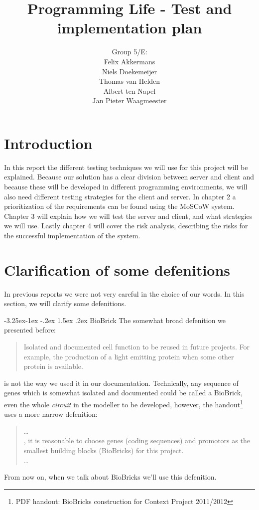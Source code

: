 \documentclass[a4paper]{article}
\title{Programming Life - Test and implementation plan }
\author{Group 5/E:\\
Felix Akkermans \\
Niels Doekemeijer \\
Thomas van Helden \\
Albert ten Napel \\
Jan Pieter Waagmeester}
\makeatletter
\renewcommand\paragraph{\@startsection{paragraph}{4}{\z@}%
  {-3.25ex\@plus -1ex \@minus -.2ex}%
  {1.5ex \@plus .2ex}%
  {\normalfont\normalsize\bfseries}}
\makeatother
\begin{document}
\maketitle

\vfill

\small{\tableofcontents}
\pagebreak

\section{Introduction}
In this report the different testing techniques we will use for this project will be explained. Because our solution has a clear division between server and client and because these will be developed in different programming environments, we will also need different testing strategies for the client and server. In chapter 2 a prioritization of the requirements can be found using the MoSCoW system. Chapter 3 will explain how we will test the server and client, and what strategies we will use. Lastly chapter 4 will cover the risk analysis, describing the risks for the successful implementation of the system.

\section{Clarification of some defenitions}
In previous reports we were not very careful in the choice of our words. In this section, we will clarify some defenitions.

\paragraph{BioBrick}
The somewhat broad defenition we presented before:
\begin{quote}Isolated and documented cell function to be reused in future projects. For example, the production of a light emitting protein when some other protein is available.
\end{quote}
is not the way we used it in our documentation. Technically, any sequence of genes which is somewhat isolated and documented could be called a BioBrick, even the whole \textit{circuit} in the modeller to be developed, however, the handout\footnote{PDF handout: BioBricks construction for Context Project 2011/2012} uses a more narrow defenition:
\begin{quote}
	\dots \\
	, it is reasonable to choose genes (coding sequences) and promotors as the smallest building blocks (BioBricks) for this project.\\ \dots
\end{quote}
From now on, when we talk about BioBricks we'll use this defenition.
\end{document}
